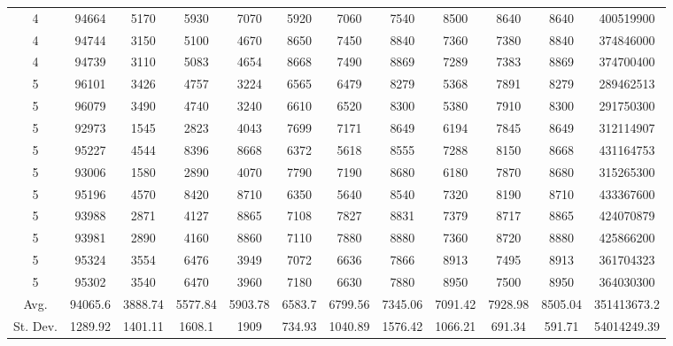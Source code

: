 \documentclass[journal]{IEEEtran}
\begin{document}
\begin{table}
\begin{tabular}{|cc|cccccccc|cc|}
4	&	94664	&	5170	&	5930	&	7070	&	5920	&	7060	&	7540	&	8500	&	8640	&	8640	&	400519900	\\
4	&	94744	&	3150	&	5100	&	4670	&	8650	&	7450	&	8840	&	7360	&	7380	&	8840	&	374846000	\\
4	&	94739	&	3110	&	5083	&	4654	&	8668	&	7490	&	8869	&	7289	&	7383	&	8869	&	374700400	\\
\hline																							
5	&	96101	&	3426	&	4757	&	3224	&	6565	&	6479	&	8279	&	5368	&	7891	&	8279	&	289462513	\\
5	&	96079	&	3490	&	4740	&	3240	&	6610	&	6520	&	8300	&	5380	&	7910	&	8300	&	291750300	\\
5	&	92973	&	1545	&	2823	&	4043	&	7699	&	7171	&	8649	&	6194	&	7845	&	8649	&	312114907	\\
5	&	95227	&	4544	&	8396	&	8668	&	6372	&	5618	&	8555	&	7288	&	8150	&	8668	&	431164753	\\
5	&	93006	&	1580	&	2890	&	4070	&	7790	&	7190	&	8680	&	6180	&	7870	&	8680	&	315265300	\\
5	&	95196	&	4570	&	8420	&	8710	&	6350	&	5640	&	8540	&	7320	&	8190	&	8710	&	433367600	\\
5	&	93988	&	2871	&	4127	&	8865	&	7108	&	7827	&	8831	&	7379	&	8717	&	8865	&	424070879	\\
5	&	93981	&	2890	&	4160	&	8860	&	7110	&	7880	&	8880	&	7360	&	8720	&	8880	&	425866200	\\
5	&	95324	&	3554	&	6476	&	3949	&	7072	&	6636	&	7866	&	8913	&	7495	&	8913	&	361704323	\\
5	&	95302	&	3540	&	6470	&	3960	&	7180	&	6630	&	7880	&	8950	&	7500	&	8950	&	364030300	\\
\hline																							
Avg.	&	94065.6	&	3888.74	&	5577.84	&	5903.78	&	6583.7	&	6799.56	&	7345.06	&	7091.42	&	7928.98	&	8505.04	&	351413673.2	\\
St. Dev.	&	1289.92	&	1401.11	&	1608.1	&	1909	&	734.93	&	1040.89	&	1576.42	&	1066.21	&	691.34	&	591.71	&	54014249.39	\\
\hline																							
\end{tabular}
\end{table}
\end{document}
